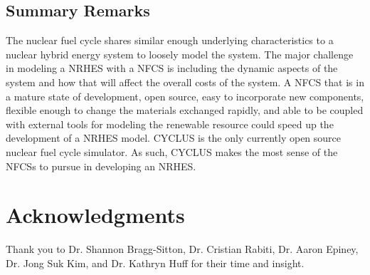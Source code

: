 \documentclass{article}                                                                           %
\begin{document}
\begin{linenumbers}
\section{Summary Remarks}
The nuclear fuel cycle shares similar enough underlying characteristics to a nuclear hybrid energy system to loosely model the system. The major challenge in modeling a NRHES with a NFCS is including the dynamic aspects of the system and how that will affect the overall costs of the system. A NFCS that is in a mature state of development, open source, easy to incorporate new components, flexible enough to change the materials exchanged rapidly, and able to be coupled with external tools for modeling the renewable resource could speed up the development of a NRHES model. CYCLUS is the only currently open source nuclear fuel cycle simulator.  As such, CYCLUS makes the most sense of the NFCSs to pursue in developing an NRHES.
\end{linenumbers}


\pagebreak
\section*{Acknowledgments}

Thank you to Dr. Shannon Bragg-Sitton, Dr. Cristian Rabiti, Dr. Aaron Epiney, Dr. Jong Suk Kim, and Dr. Kathryn Huff for their time and insight.

\pagebreak


\end{document}
